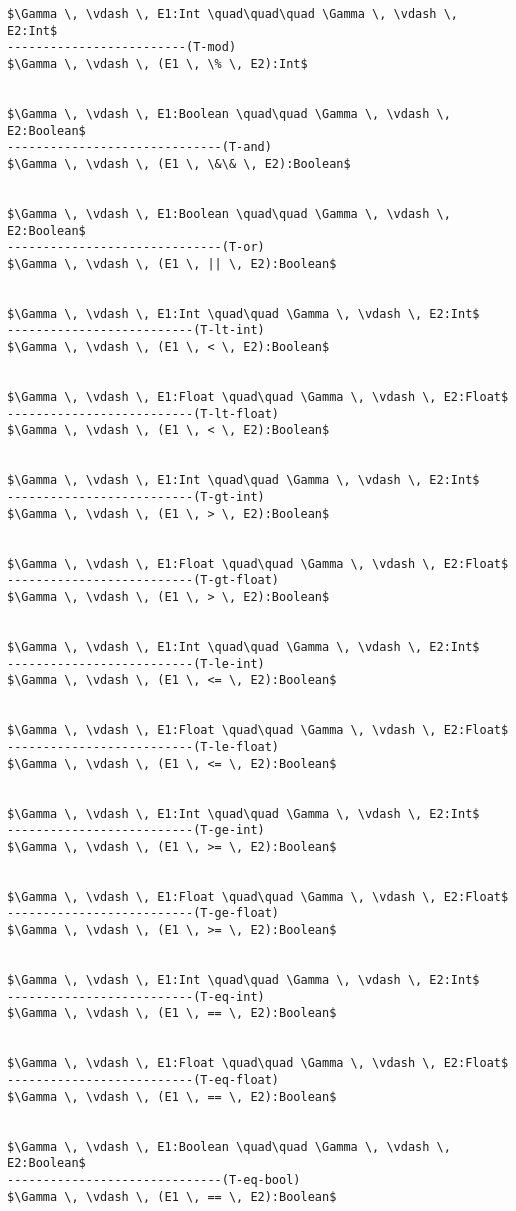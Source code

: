 \documentclass[11pt, a4paper]{article}
\begin{document}
\begin{lstlisting}
$\Gamma \, \vdash \, E1:Int \quad\quad\quad \Gamma \, \vdash \, E2:Int$
-------------------------(T-mod)
$\Gamma \, \vdash \, (E1 \, \% \, E2):Int$


$\Gamma \, \vdash \, E1:Boolean \quad\quad \Gamma \, \vdash \, E2:Boolean$
------------------------------(T-and)
$\Gamma \, \vdash \, (E1 \, \&\& \, E2):Boolean$


$\Gamma \, \vdash \, E1:Boolean \quad\quad \Gamma \, \vdash \, E2:Boolean$
------------------------------(T-or)
$\Gamma \, \vdash \, (E1 \, || \, E2):Boolean$


$\Gamma \, \vdash \, E1:Int \quad\quad \Gamma \, \vdash \, E2:Int$
--------------------------(T-lt-int)
$\Gamma \, \vdash \, (E1 \, < \, E2):Boolean$


$\Gamma \, \vdash \, E1:Float \quad\quad \Gamma \, \vdash \, E2:Float$
--------------------------(T-lt-float)
$\Gamma \, \vdash \, (E1 \, < \, E2):Boolean$


$\Gamma \, \vdash \, E1:Int \quad\quad \Gamma \, \vdash \, E2:Int$
--------------------------(T-gt-int)
$\Gamma \, \vdash \, (E1 \, > \, E2):Boolean$


$\Gamma \, \vdash \, E1:Float \quad\quad \Gamma \, \vdash \, E2:Float$
--------------------------(T-gt-float)
$\Gamma \, \vdash \, (E1 \, > \, E2):Boolean$


$\Gamma \, \vdash \, E1:Int \quad\quad \Gamma \, \vdash \, E2:Int$
--------------------------(T-le-int)
$\Gamma \, \vdash \, (E1 \, <= \, E2):Boolean$


$\Gamma \, \vdash \, E1:Float \quad\quad \Gamma \, \vdash \, E2:Float$
--------------------------(T-le-float)
$\Gamma \, \vdash \, (E1 \, <= \, E2):Boolean$


$\Gamma \, \vdash \, E1:Int \quad\quad \Gamma \, \vdash \, E2:Int$
--------------------------(T-ge-int)
$\Gamma \, \vdash \, (E1 \, >= \, E2):Boolean$


$\Gamma \, \vdash \, E1:Float \quad\quad \Gamma \, \vdash \, E2:Float$
--------------------------(T-ge-float)
$\Gamma \, \vdash \, (E1 \, >= \, E2):Boolean$


$\Gamma \, \vdash \, E1:Int \quad\quad \Gamma \, \vdash \, E2:Int$
--------------------------(T-eq-int)
$\Gamma \, \vdash \, (E1 \, == \, E2):Boolean$


$\Gamma \, \vdash \, E1:Float \quad\quad \Gamma \, \vdash \, E2:Float$
--------------------------(T-eq-float)
$\Gamma \, \vdash \, (E1 \, == \, E2):Boolean$


$\Gamma \, \vdash \, E1:Boolean \quad\quad \Gamma \, \vdash \, E2:Boolean$
------------------------------(T-eq-bool)
$\Gamma \, \vdash \, (E1 \, == \, E2):Boolean$



\end{lstlisting}
\end{document}
